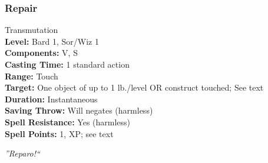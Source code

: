 \subsubsection{Repair}
\label{Spell:Repair}
Transmutation
\\ \textbf{Level:} Bard 1, Sor/Wiz 1
\\ \textbf{Components:} V, S
\\ \textbf{Casting Time:} 1 standard action
\\ \textbf{Range:} Touch
\\ \textbf{Target:} One object of up to 1 lb./level OR construct touched; See text
\\ \textbf{Duration:} Instantaneous
\\ \textbf{Saving Throw:} Will negates (harmless)
\\ \textbf{Spell Resistance:} Yes (harmless)
\\ \textbf{Spell Points:} 1, XP; see text

\emph{''Reparo!``}

